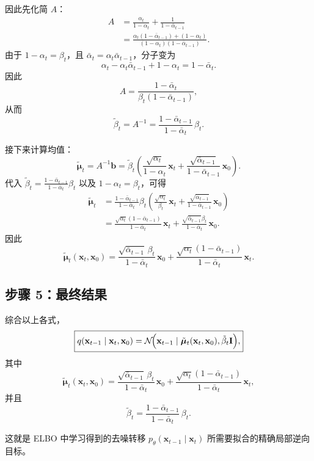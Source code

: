 因此先化简 \(A\)：
\[
\begin{aligned}
A
&=
\frac{\alpha_t}{1-\alpha_t}
+
\frac{1}{1-\bar{\alpha}_{t-1}}
\\[4pt]
&=
\frac{
\alpha_t(1-\bar{\alpha}_{t-1}) + (1-\alpha_t)
}{
(1-\alpha_t)(1-\bar{\alpha}_{t-1})
}.
\end{aligned}
\]
由于 \(1-\alpha_t=\beta_t\)，且 \(\bar{\alpha}_t=\alpha_t\bar{\alpha}_{t-1}\)，分子变为
\[
\alpha_t - \alpha_t\bar{\alpha}_{t-1} + 1 - \alpha_t
=
1-\bar{\alpha}_t.
\]
因此
\[
A
=
\frac{
1-\bar{\alpha}_t
}{
\beta_t(1-\bar{\alpha}_{t-1})
},
\]
从而
\[
\boxed{
\tilde{\beta}_t
=
A^{-1}
=
\frac{1-\bar{\alpha}_{t-1}}{1-\bar{\alpha}_t}\,\beta_t.
}
\]

接下来计算均值：
\[
\tilde{\boldsymbol{\mu}}_t
=
A^{-1}\mathbf{b}
=
\tilde{\beta}_t
\left(
\frac{\sqrt{\alpha_t}}{1-\alpha_t}\,\mathbf{x}_t
+
\frac{\sqrt{\bar{\alpha}_{t-1}}}{1-\bar{\alpha}_{t-1}}\,\mathbf{x}_0
\right).
\]
代入
\(
\tilde{\beta}_t
=
\frac{1-\bar{\alpha}_{t-1}}{1-\bar{\alpha}_t}\beta_t
\)
以及 \(1-\alpha_t=\beta_t\)，可得
\[
\begin{aligned}
\tilde{\boldsymbol{\mu}}_t
&=
\frac{1-\bar{\alpha}_{t-1}}{1-\bar{\alpha}_t}\beta_t
\left(
\frac{\sqrt{\alpha_t}}{\beta_t}\,\mathbf{x}_t
+
\frac{\sqrt{\bar{\alpha}_{t-1}}}{1-\bar{\alpha}_{t-1}}\,\mathbf{x}_0
\right)
\\[6pt]
&=
\frac{\sqrt{\alpha_t}(1-\bar{\alpha}_{t-1})}{1-\bar{\alpha}_t}\,\mathbf{x}_t
+
\frac{\sqrt{\bar{\alpha}_{t-1}}\beta_t}{1-\bar{\alpha}_t}\,\mathbf{x}_0.
\end{aligned}
\]
因此
\[
\boxed{
\tilde{\boldsymbol{\mu}}_t(\mathbf{x}_t,\mathbf{x}_0)
=
\frac{
\sqrt{\bar{\alpha}_{t-1}}\,\beta_t
}{
1-\bar{\alpha}_t
}\,\mathbf{x}_0
+
\frac{
\sqrt{\alpha_t}(1-\bar{\alpha}_{t-1})
}{
1-\bar{\alpha}_t
}\,\mathbf{x}_t.
}
\]

\subsection*{步骤 5：最终结果}

综合以上各式，
\[
\boxed{
q(\mathbf{x}_{t-1}\mid \mathbf{x}_t,\mathbf{x}_0)
=
\mathcal{N}\!\Bigl(
\mathbf{x}_{t-1}\mid
\tilde{\boldsymbol{\mu}}_t(\mathbf{x}_t,\mathbf{x}_0),
\tilde{\beta}_t\mathbf{I}
\Bigr),
}
\]
其中
\[
\tilde{\boldsymbol{\mu}}_t(\mathbf{x}_t,\mathbf{x}_0)
=
\frac{
\sqrt{\bar{\alpha}_{t-1}}\,\beta_t
}{
1-\bar{\alpha}_t
}\,\mathbf{x}_0
+
\frac{
\sqrt{\alpha_t}(1-\bar{\alpha}_{t-1})
}{
1-\bar{\alpha}_t
}\,\mathbf{x}_t,
\]
并且
\[
\tilde{\beta}_t
=
\frac{
1-\bar{\alpha}_{t-1}
}{
1-\bar{\alpha}_t
}\,\beta_t.
\]

这就是 ELBO 中学习得到的去噪转移 \(p_\theta(\mathbf{x}_{t-1}\mid \mathbf{x}_t)\) 所需要拟合的精确局部逆向目标。
